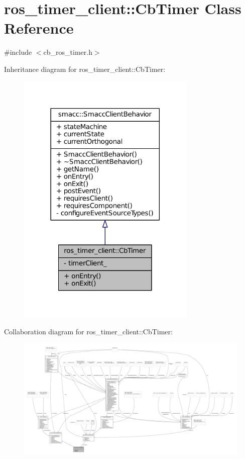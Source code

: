 \hypertarget{classros__timer__client_1_1CbTimer}{}\section{ros\+\_\+timer\+\_\+client\+:\+:Cb\+Timer Class Reference}
\label{classros__timer__client_1_1CbTimer}


{\ttfamily \#include $<$cb\+\_\+ros\+\_\+timer.\+h$>$}



Inheritance diagram for ros\+\_\+timer\+\_\+client\+:\+:Cb\+Timer\+:
\nopagebreak
\begin{figure}[H]
\begin{center}
\leavevmode
\includegraphics[width=242pt]{classros__timer__client_1_1CbTimer__inherit__graph}
\end{center}
\end{figure}


Collaboration diagram for ros\+\_\+timer\+\_\+client\+:\+:Cb\+Timer\+:
\nopagebreak
\begin{figure}[H]
\begin{center}
\leavevmode
\includegraphics[width=350pt]{classros__timer__client_1_1CbTimer__coll__graph}
\end{center}
\end{figure}
